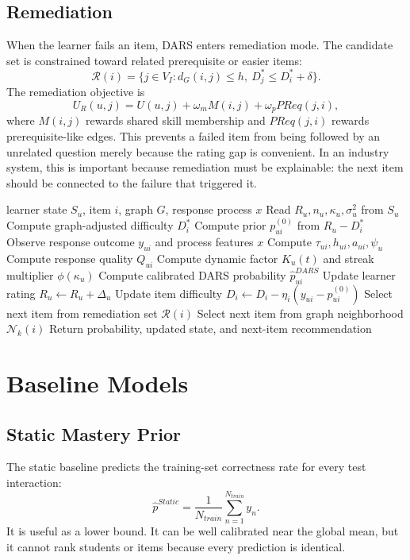 \documentclass[conference]{IEEEtran}
\begin{document}
\subsection{Remediation}
When the learner fails an item, DARS enters remediation mode. The candidate set is constrained toward related prerequisite or easier items:
\begin{equation}
\mathcal{R}(i)=\{j\in V_I:d_G(i,j)\leq h,\ D_j^\ast\leq D_i^\ast+\delta\}.
\end{equation}
The remediation objective is
\begin{equation}
U_R(u,j)=U(u,j)+\omega_m M(i,j)+\omega_p PReq(j,i),
\end{equation}
where $M(i,j)$ rewards shared skill membership and $PReq(j,i)$ rewards prerequisite-like edges. This prevents a failed item from being followed by an unrelated question merely because the rating gap is convenient. In an industry system, this is important because remediation must be explainable: the next item should be connected to the failure that triggered it.

\begin{algorithm}[t]
\caption{DARS Online Scoring and Routing}
\label{alg:dars}
\footnotesize
\begin{algorithmic}[1]
\REQUIRE learner state $S_u$, item $i$, graph $G$, response process $x$
\STATE Read $R_u,n_u,\kappa_u,\sigma_u^2$ from $S_u$
\STATE Compute graph-adjusted difficulty $D_i^\ast$
\STATE Compute prior $p^{(0)}_{ui}$ from $R_u-D_i^\ast$
\STATE Observe response outcome $y_{ui}$ and process features $x$
\STATE Compute $\tau_{ui},h_{ui},a_{ui},\psi_u$
\STATE Compute response quality $Q_{ui}$
\STATE Compute dynamic factor $K_u(t)$ and streak multiplier $\phi(\kappa_u)$
\STATE Compute calibrated DARS probability $\hat{p}^{DARS}_{ui}$
\STATE Update learner rating $R_u \leftarrow R_u+\Delta_u$
\STATE Update item difficulty $D_i \leftarrow D_i-\eta_i(y_{ui}-p^{(0)}_{ui})$
    \STATE Select next item from remediation set $\mathcal{R}(i)$
\ELSE
    \STATE Select next item from graph neighborhood $\mathcal{N}_k(i)$
\ENDIF
\STATE Return probability, updated state, and next-item recommendation
\end{algorithmic}
\end{algorithm}

\section{Baseline Models}
\subsection{Static Mastery Prior}
The static baseline predicts the training-set correctness rate for every test interaction:
\begin{equation}
\hat{p}^{Static}=\frac{1}{N_{train}}\sum_{n=1}^{N_{train}}y_n.
\end{equation}
It is useful as a lower bound. It can be well calibrated near the global mean, but it cannot rank students or items because every prediction is identical.
\end{document}
